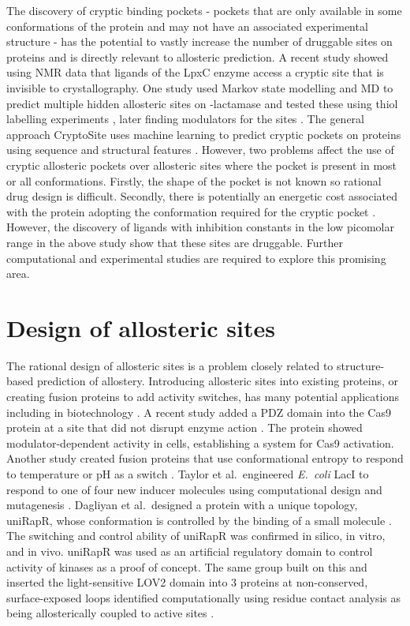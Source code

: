 The discovery of cryptic binding pockets - pockets that are only available in some conformations of the protein and may not have an associated experimental structure - has the potential to vastly increase the number of druggable sites on proteins \cite{Boehr2009} and is directly relevant to allosteric prediction.
A recent study \cite{Lee2016} showed using NMR data that ligands of the LpxC enzyme access a cryptic site that is invisible to crystallography.
One study used Markov state modelling and MD to predict multiple hidden allosteric sites on \textbeta -lactamase and tested these using thiol labelling experiments \cite{Bowman2015}, later finding modulators for the sites \cite{Hart2017}.
The general approach CryptoSite uses machine learning to predict cryptic pockets on proteins using sequence and structural features \cite{Cimmermancic2016}.
However, two problems affect the use of cryptic allosteric pockets over allosteric sites where the pocket is present in most or all conformations.
Firstly, the shape of the pocket is not known so rational drug design is difficult.
Secondly, there is potentially an energetic cost associated with the protein adopting the conformation required for the cryptic pocket \cite{Oleinikovas2016}.
However, the discovery of ligands with inhibition constants in the low picomolar range in the above study \cite{Lee2016} show that these sites are druggable.
Further computational and experimental studies are required to explore this promising area.

\section{Design of allosteric sites}

The rational design of allosteric sites is a problem closely related to structure-based prediction of allostery.
Introducing allosteric sites into existing proteins, or creating fusion proteins to add activity switches, has many potential applications including in biotechnology \cite{Makhlynets2015}.
A recent study added a PDZ domain into the Cas9 protein at a site that did not disrupt enzyme action \cite{Oakes2016}.
The protein showed modulator-dependent activity in cells, establishing a system for Cas9 activation.
Another study created fusion proteins that use conformational entropy to respond to temperature or pH as a switch \cite{Choi2015}.
Taylor et al.\ engineered \textit{E.\ coli} LacI to respond to one of four new inducer molecules using computational design and mutagenesis \cite{Taylor2016}.
Dagliyan et al.\ designed a protein with a unique topology, uniRapR, whose conformation is controlled by the binding of a small molecule \cite{Dagliyan2013}.
The switching and control ability of uniRapR was confirmed in silico, in vitro, and in vivo.
uniRapR was used as an artificial regulatory domain to control activity of kinases as a proof of concept.
The same group built on this and inserted the light-sensitive LOV2 domain into 3 proteins at non-conserved, surface-exposed loops identified computationally using residue contact analysis as being allosterically coupled to active sites \cite{Dagliyan2016}.


